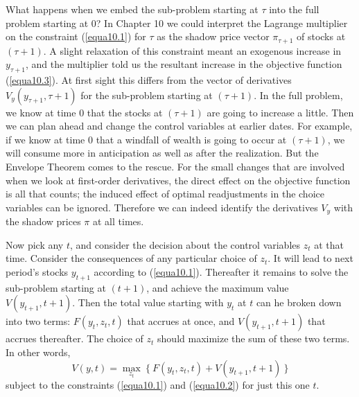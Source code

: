 What happens when we embed the sub-problem starting at $\tau$ into the full problem starting at 0? In Chapter 10 we could interpret the Lagrange multiplier on the constraint (\ref{equa10.1}) for $\tau$ as the shadow price vector $\pi_{\tau+1}$ of stocks at $(\tau+1)$. A slight relaxation of this constraint meant an exogenous increase in $y_{\tau+1}$, and the multiplier told us the resultant increase in the objective function (\ref{equa10.3}). At first sight this differs from the vector of derivatives
$V_y(y_{\tau+1},\tau+ 1)$ for the sub-problem starting at $(\tau + 1)$. In the full problem, we know at time 0 that the stocks at $(\tau + 1)$ are going to increase a little. Then we can plan ahead and change the control variables at earlier dates. For example, if we know at time 0 that a windfall of wealth is going to occur at $(\tau + 1)$, we will consume more in anticipation as well as after the realization. But the Envelope Theorem comes to the rescue. For the small changes that are involved when we look at first-order derivatives, the direct effect on the objective function is all that counts; the induced effect of optimal readjustments in the choice variables can be ignored. Therefore we can indeed identify the derivatives $V_y$ with the shadow prices $\pi$ at all times.

Now pick any $t$, and consider the decision about the control variables $z_t$ at that time. Consider the consequences of any particular choice of $z_t$. It will lead to next period's stocks $y_{t+1}$ according to (\ref{equa10.1}). Thereafter it remains to solve the sub-problem starting at $(t + 1)$, and achieve the maximum value $V(y_{t+1}, t + 1)$. Then the total value starting with $y_t$ at $t$ can he broken down into two terms: $F(y_t,z_t, t)$ that accrues at once, and $V(y_{t+1},t + 1)$ that accrues thereafter. The choice of $z_t$ should maximize the sum of these two terms. In other words,
\begin{equation} \label{equa11.1}
V(y,t) = \mathop{\max}\limits_{z_t} \  \{  \ F(y_t, z_t, t) + V(y_{t+1}, t+1)  \  \}
\end{equation}
subject to the constraints (\ref{equa10.1}) and (\ref{equa10.2}) for just this one $t$.

